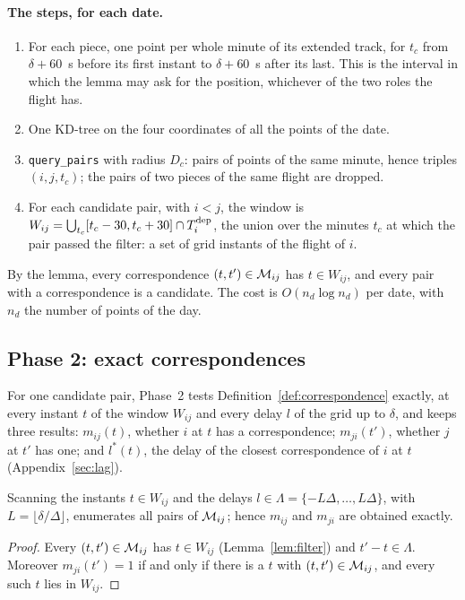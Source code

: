 \paragraph{The steps, for each date.}
\begin{enumerate}
  \item For each piece, one point per whole minute of its extended track, for $t_c$ from
        $\delta+60$~s before its first instant to $\delta+60$~s after its last. This is the
        interval in which the lemma may ask for the position, whichever of the two roles the
        flight has.
  \item One KD-tree on the four coordinates of all the points of the date.
  \item \texttt{query\_pairs} with radius $D_c$: pairs of points of the same minute, hence
        triples $(i,j,t_c)$; the pairs of two pieces of the same flight are dropped.
  \item For each candidate pair, with $i<j$, the window is
        $W_{ij}=\bigcup_{t_c}[t_c-30,t_c+30]\cap T^{\mathrm{dep}}_i$, the union over the minutes $t_c$ at which
        the pair passed the filter: a set of grid instants of the flight of $i$.
\end{enumerate}
By the lemma, every correspondence $(t,t')\in\mathcal{M}_{ij}$ has $t\in W_{ij}$, and every pair with a
correspondence is a candidate. The cost is $O(n_d\log n_d)$ per date, with $n_d$ the number of
points of the day.

\subsection{Phase 2: exact correspondences}\label{sec:phase2}

For one candidate pair, Phase~2 tests Definition~\ref{def:correspondence} exactly, at every
instant $t$ of the window $W_{ij}$ and every delay $l$ of the grid up to $\delta$, and keeps three
results: $m_{ij}(t)$, whether $i$ at $t$ has a correspondence; $m_{ji}(t')$, whether $j$ at $t'$
has one; and $l^*(t)$, the delay of the closest correspondence of $i$ at $t$
(Appendix~\ref{sec:lag}).

\begin{lemma}\label{lem:scan}
Scanning the instants $t\in W_{ij}$ and the delays $l\in\Lambda=\{-L\Delta,\dots,L\Delta\}$, with
$L=\lfloor\delta/\Delta\rfloor$, enumerates all pairs of $\mathcal{M}_{ij}$; hence $m_{ij}$ and $m_{ji}$ are
obtained exactly.
\end{lemma}

\begin{proof}
Every $(t,t')\in\mathcal{M}_{ij}$ has $t\in W_{ij}$ (Lemma~\ref{lem:filter}) and $t'-t\in\Lambda$. Moreover
$m_{ji}(t')=1$ if and only if there is a $t$ with $(t,t')\in\mathcal{M}_{ij}$, and every such $t$ lies in
$W_{ij}$.
\end{proof}

